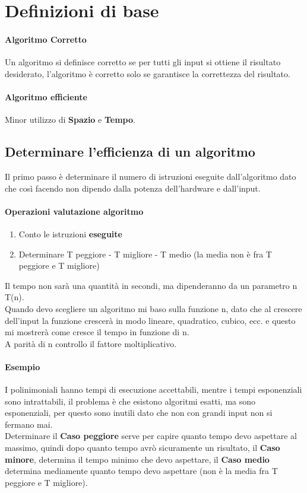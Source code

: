 \section{Definizioni di base}
\paragraph*{Algoritmo Corretto} Un algoritmo si definisce corretto se per tutti gli input si ottiene il 
risultato desiderato, l'algoritmo è corretto solo se garantisce la correttezza del risultato.
\paragraph*{Algoritmo efficiente} Minor utilizzo di \textbf{Spazio} e \textbf{Tempo}.

\subsection*{Determinare l'efficienza di un algoritmo}
Il primo passo è determinare il numero di istruzioni eseguite dall'algoritmo
dato che così facendo non dipendo dalla potenza dell'hardware
e dall'input.
\paragraph*{Operazioni valutazione algoritmo}
\begin{enumerate}
    \item Conto le istruzioni \textbf{eseguite}
    \item Determinare T peggiore - T migliore - T medio (la media non è fra
    T peggiore e T migliore)
\end{enumerate}
Il tempo non sarà una quantità in secondi, ma dipenderanno da un parametro
n T(n).
\\ Quando devo scegliere un algoritmo mi baso sulla funzione n, dato che al crescere
dell'input la funzione crescerà in modo lineare, quadratico, cubico, ecc. e 
questo mi mostrerà come cresce il tempo in funzione di n.
\\ A parità di n controllo il fattore moltiplicativo.
\paragraph*{Esempio} I polinimoniali hanno tempi di esecuzione accettabili,
mentre i tempi esponenziali sono intrattabili, il problema è che esistono algoritmi esatti,
ma sono esponenziali, per questo sono inutili dato che non con grandi input non
si fermano mai.
\\ Determinare il \textbf{Caso peggiore} serve per capire quanto tempo devo aspettare
al massimo, quindi dopo quanto tempo avrò sicuramente un risultato, il \textbf{Caso minore},
determina il tempo minimo che devo aspettare, il \textbf{Caso medio} determina mediamente
quanto tempo devo aspettare (non è la media fra T peggiore e T migliore).
